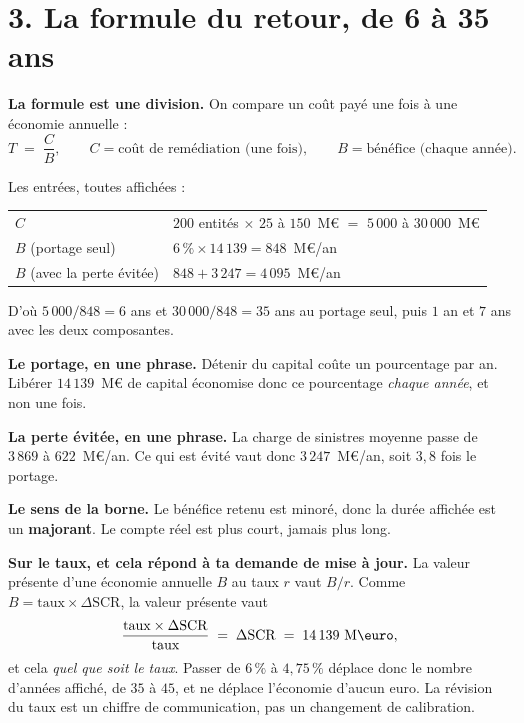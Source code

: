 \documentclass[11pt,a4paper]{article}
\begin{document}
\section*{3. La formule du retour, de 6 à 35 ans}

\textbf{La formule est une division.} On compare un coût payé une fois à une économie annuelle :
\[
  T \;=\; \frac{C}{B}, \qquad
  C = \text{coût de remédiation (une fois)}, \qquad
  B = \text{bénéfice (chaque année)}.
\]

Les entrées, toutes affichées :

\begin{center}
\begin{tabular}{@{}l l@{}}
\toprule
$C$ & $200$ entités $\times$ $25$ à $150$~M\euro{} $=$ $5\,000$ à $30\,000$~M\euro \\
$B$ (portage seul) & $6\,\% \times 14\,139 = 848$~M\euro/an \\
$B$ (avec la perte évitée) & $848 + 3\,247 = 4\,095$~M\euro/an \\
\bottomrule
\end{tabular}
\end{center}

D'où $5\,000 / 848 = 6$ ans et $30\,000 / 848 = 35$ ans au portage seul, puis $1$ an et $7$ ans
avec les deux composantes.

\textbf{Le portage, en une phrase.} Détenir du capital coûte un pourcentage par an. Libérer
$14\,139$~M\euro{} de capital économise donc ce pourcentage \emph{chaque année}, et non une fois.

\textbf{La perte évitée, en une phrase.} La charge de sinistres moyenne passe de $3\,869$ à
$622$~M\euro/an. Ce qui est évité vaut donc $3\,247$~M\euro/an, soit $3{,}8$ fois le portage.

\textbf{Le sens de la borne.} Le bénéfice retenu est minoré, donc la durée affichée est un
\textbf{majorant}. Le compte réel est plus court, jamais plus long.

\textbf{Sur le taux, et cela répond à ta demande de mise à jour.} La valeur présente d'une
économie annuelle $B$ au taux $r$ vaut $B/r$. Comme $B = \text{taux} \times \Delta\mathrm{SCR}$,
la valeur présente vaut
\[
  \frac{\text{taux} \times \Delta\mathrm{SCR}}{\text{taux}} \;=\; \Delta\mathrm{SCR}
  \;=\; 14\,139~\text{M\euro},
\]
et cela \emph{quel que soit le taux}. Passer de $6\,\%$ à $4{,}75\,\%$ déplace donc le nombre
d'années affiché, de $35$ à $45$, et ne déplace l'économie d'aucun euro. La révision du taux est
un chiffre de communication, pas un changement de calibration.
\end{document}
